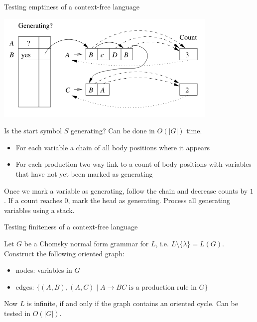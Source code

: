 \documentclass[handout]{beamer}
\begin{document}
\begin{frame}{Testing emptiness of a context-free language}

    \vspace{-4pt}
    \begin{center}
        \includegraphics[width=0.8\textwidth]{files/emptyCFL.PNG}    
    \end{center}
    \vspace{-18pt}
    Is the start symbol $S$ generating? Can be done in $O(|G|)$ time. 
    \vspace{-4pt}   
    \begin{itemize}
        \item For each variable a chain of all body positions where it appears
        \item For each production two-way link to a count of body positions with variables that have not yet been marked as generating
    \end{itemize}
    \vspace{-4pt}
    Once we mark a variable as generating, follow the chain and decrease counts by $1$. If a count reaches $0$, mark the head as generating. Process all generating variables using a stack.
    
\end{frame}


\begin{frame}{Testing finiteness of a context-free language}

    Let $G$ be a Chomsky normal form grammar for $L$, i.e. $L\setminus\{\lambda\}=L(G)$. Construct the following oriented graph: 
    \begin{itemize}
        \item nodes: variables in $G$
        \item edges: $\{(A,B),(A,C) \mid A\rightarrow BC\text{ is a production rule in }G\}$
    \end{itemize}
    Now $L$ is infinite, if and only if the graph contains an oriented cycle. Can be tested in $O(|G|)$.


\end{frame}
\end{document}
